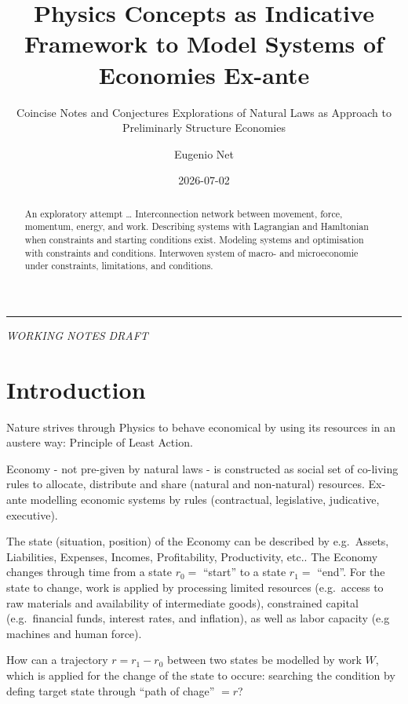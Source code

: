 \documentclass[
  letterpaper,
  DIV=11,
  numbers=noendperiod]{scrartcl}
\title{Physics Concepts as Indicative Framework to Model Systems of
Economies Ex-ante}
\subtitle{Coincise Notes and Conjectures Explorations of Natural Laws as
Approach to Preliminarly Structure Economies}
\author{Eugenio Net}
\date{2026-07-02}
\renewcommand*\contentsname{Table of contents}
\newcommand\contentsname{Table of contents}
\begin{document}
\maketitle
\begin{abstract}
An exploratory attempt \ldots{} Interconnection network between
movement, force, momentum, energy, and work. Describing systems with
Lagrangian and Hamltonian when constraints and starting conditions
exist. Modeling systems and optimisation with constraints and
conditions. Interwoven system of macro- and microeconomie under
constraints, limitations, and conditions.
\end{abstract}

\renewcommand*\contentsname{Table of contents}
{
\hypersetup{linkcolor=}
\setcounter{tocdepth}{3}
\tableofcontents
}

\begin{center}\rule{0.5\linewidth}{0.5pt}\end{center}

\hfill\break
\hfill\break

\emph{WORKING NOTES DRAFT}

\hfill\break
\hfill\break

\section{Introduction}\label{sec-introduction}

Nature strives through Physics to behave economical by using its
resources in an austere way: Principle of Least Action.

Economy - not pre-given by natural laws - is constructed as social set
of co-living rules to allocate, distribute and share (natural and
non-natural) resources. Ex-ante modelling economic systems by rules
(contractual, legislative, judicative, executive).

The state (situation, position) of the Economy can be described by
e.g.~Assets, Liabilities, Expenses, Incomes, Profitability,
Productivity, etc.. The Economy changes through time from a state
\(r_0=\) ``start'' to a state \(r_1=\) ``end''. For the state to change,
work is applied by processing limited resources (e.g.~access to raw
materials and availability of intermediate goods), constrained capital
(e.g.~financial funds, interest rates, and inflation), as well as labor
capacity (e.g machines and human force).

How can a trajectory \(r = r_1 - r_0\) between two states be modelled by
work \(W\), which is applied for the change of the state to occure:
searching the condition by defing target state through ``path of chage''
\(=r\)?
\end{document}
